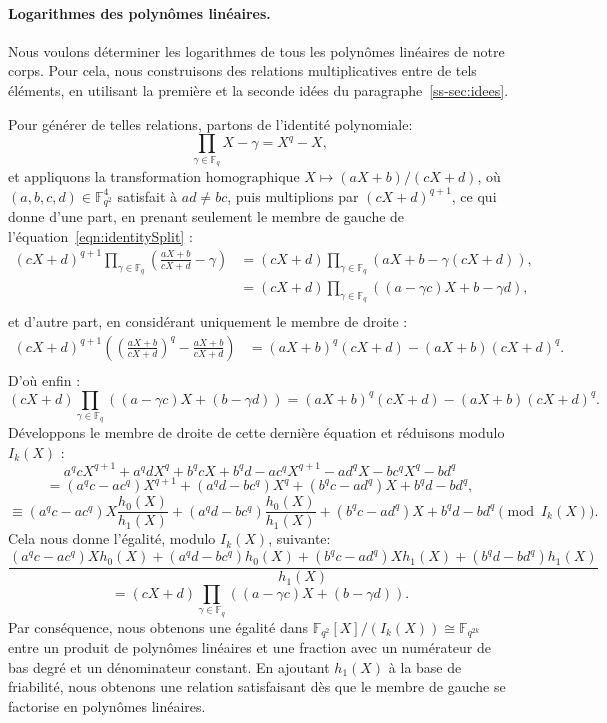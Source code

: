 \documentclass[a4paper, titlepage, 11pt]{article}
\theoremstyle{definition}
\theoremstyle{remark}
\def\gf #1{\mathbb{F}_{#1}}
\begin{document}
\paragraph{Logarithmes des polynômes linéaires.}Nous voulons déterminer les logarithmes de tous les polynômes linéaires de notre corps. Pour cela, nous construisons des relations multiplicatives entre de tels éléments, en utilisant la première et la seconde idées du paragraphe~\ref{ss-sec:idees}.

Pour générer de telles relations, partons de l'identité polynomiale:
\begin{equation}\label{eqn:identitySplit}
\prod_{\gamma\in\gf{q}} X-\gamma = X^q-X,
\end{equation}
et appliquons la transformation homographique $X \mapsto (aX+b)/(cX+d)$, où $(a,b,c,d)\in\gf{q^2}^4$ satisfait à $ad\neq bc$, puis multiplions par $(cX+d)^{q+1}$, ce qui donne d'une part, en prenant seulement le membre de gauche de l'équation~\ref{eqn:identitySplit} :
\begin{align*}
(cX+d)^{q+1} \prod_{\gamma\in\gf{q}} \left(\frac{aX+b}{cX+d}-\gamma\right) &= (cX+d) \prod_{\gamma\in\gf{q}} (aX+b-\gamma(cX+d)), \\ 
&= (cX+d) \prod_{\gamma\in\gf{q}} ((a-\gamma c)X+b-\gamma d),\\
\end{align*}
et d'autre part, en considérant uniquement le membre de droite :
\begin{align*}
(cX+d)^{q+1}\left({\left(\frac{aX+b}{cX+d}\right)}^q - \frac{aX+b}{cX+d}\right) &= (aX+b)^q(cX+d) - (aX+b)(cX+d)^q. \\
\end{align*}
D'où enfin :
$$(cX+d) \prod_{\gamma\in\gf{q}}((a-\gamma c)X + (b-\gamma d)) = (aX+b)^q(cX+d) - (aX+b)(cX+d)^q.$$
Développons le membre de droite de cette dernière équation et réduisons modulo $I_k(X)$ :
$$a^qcX^{q+1} + a^qdX^q + b^qcX + b^qd - ac^qX^{q+1} - ad^qX - bc^qX^q - bd^q$$
$$= (a^qc - ac^q)X^{q+1} + (a^qd - bc^q)X^q + (b^qc - ad^q)X + b^qd - bd^q,$$
$$\equiv (a^qc - ac^q)X\frac{h_0(X)}{h_1(X)} + (a^qd - bc^q)\frac{h_0(X)}{h_1(X)} + (b^qc - ad^q)X + b^qd - bd^q \pmod{I_k(X)}.$$
Cela nous donne l'égalité, modulo $I_k(X)$, suivante:
$$\frac{(a^qc - ac^q)Xh_0(X) + (a^qd - bc^q)h_0(X) + (b^qc - ad^q)Xh_1(X) + (b^qd - bd^q)h_1(X)}{h_1(X)}$$
$$= (cX+d) \prod_{\gamma\in\gf{q}}((a-\gamma c)X + (b-\gamma d)).$$
Par conséquence, nous obtenons une égalité dans $\gf{q^2}[X]/(I_k(X)) \cong \gf{q^{2k}}$ entre un produit de polynômes linéaires et une fraction avec un numérateur de bas degré et un dénominateur constant. En ajoutant $h_1(X)$ à la base de friabilité, nous obtenons une relation satisfaisant dès que le membre de gauche se factorise en polynômes linéaires.
\end{document}

